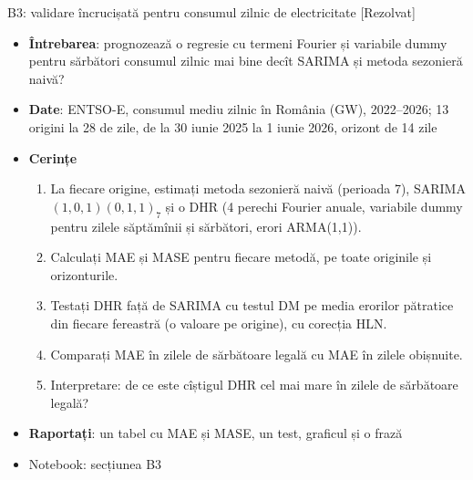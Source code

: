 \begin{frame}{B3: validare încrucișată pentru consumul zilnic de electricitate [Rezolvat]}
\itemsize{\footnotesize}
\begin{itemize}
\item \textbf{Întrebarea}: prognozează o regresie cu termeni Fourier și variabile dummy pentru sărbători consumul zilnic mai bine decît SARIMA și metoda sezonieră naivă?
\item \textbf{Date}: ENTSO-E, consumul mediu zilnic în România (GW), 2022--2026; 13 origini la 28 de zile, de la 30 iunie 2025 la 1 iunie 2026, orizont de 14 zile
\item \textbf{Cerințe}
\begin{enumerate}
    \item La fiecare origine, estimați metoda sezonieră naivă (perioada 7), SARIMA$(1,0,1)(0,1,1)_7$ și o DHR (4 perechi Fourier anuale, variabile dummy pentru zilele săptămînii și sărbători, erori ARMA(1,1)).
    \item Calculați MAE și MASE pentru fiecare metodă, pe toate originile și orizonturile.
    \item Testați DHR față de SARIMA cu testul DM pe media erorilor pătratice din fiecare fereastră (o valoare pe origine), cu corecția HLN.
    \item Comparați MAE în zilele de sărbătoare legală cu MAE în zilele obișnuite.
    \item Interpretare: de ce este cîștigul DHR cel mai mare în zilele de sărbătoare legală?
\end{enumerate}
\item \textbf{Raportați}: un tabel cu MAE și MASE, un test, graficul și o frază
\item Notebook: secțiunea B3
\end{itemize}
\end{frame}


